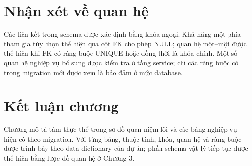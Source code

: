 \section{Nhận xét về quan hệ}

Các liên kết trong schema được xác định bằng khóa ngoại. Khả năng một phía tham gia tùy chọn thể hiện qua cột FK cho phép NULL; quan hệ một--một được thể hiện khi FK có ràng buộc UNIQUE hoặc đồng thời là khóa chính. Một số quan hệ nghiệp vụ bổ sung được kiểm tra ở tầng service; chỉ các ràng buộc có trong migration mới được xem là bảo đảm ở mức database.

\section{Kết luận chương}

Chương mô tả tám thực thể trong sơ đồ quan niệm lõi và các bảng nghiệp vụ hiện có theo migration. Với từng bảng, thuộc tính, khóa, quan hệ và ràng buộc được trình bày theo data dictionary của dự án; phần schema vật lý tiếp tục được thể hiện bằng lược đồ quan hệ ở Chương 3.
